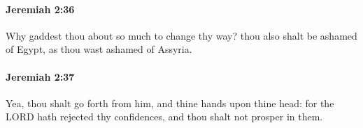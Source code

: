 		\paragraph{Jeremiah 2:36} %
			\label{JEREMIAH-2-36}

			Why gaddest thou about so much to change thy way? thou also shalt be ashamed of Egypt, as thou wast ashamed of Assyria.


		\paragraph{Jeremiah 2:37} %
			\label{JEREMIAH-2-37}

			Yea, thou shalt go forth from him, and thine hands upon thine head: for the LORD hath rejected thy confidences, and thou shalt not prosper in them.


